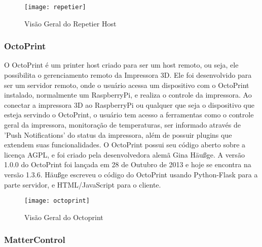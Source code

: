 \begin{figure}[H]
    \centering
    \caption[Repetier Host]{Visão Geral do Repetier Host}
    \texttt{[image: repetier]} 
\end{figure}

\subsubsection{OctoPrint}
O OctoPrint é um printer host criado para ser um host remoto, ou seja, ele possibilita o gerenciamento remoto da Impressora 3D. Ele foi desenvolvido para ser um servidor remoto, onde o usuário acessa um dispositivo com o OctoPrint instalado, normalmente um RaspberryPi, e realiza o controle da impressora. 
Ao conectar a impressora 3D ao RaspberryPi ou qualquer que seja o dispositivo que esteja servindo o OctoPrint, o usuário tem acesso a ferramentas como o controle geral da impressora, monitoração de temperaturas, ser informado através de 'Push Notifications' do status da impressora, além de possuir plugins que extendem suas funcionalidades. O OctoPrint possui seu código aberto sobre a licença AGPL, e foi criado pela desenvolvedora alemã Gina Häußge. A versão 1.0.0 do OctoPrint foi lançada em 28 de Outubro de 2013 e hoje se encontra na versão 1.3.6. 
Häußge escreveu o código do OctoPrint usando Python-Flask para a parte servidor, e HTML/JavaScript para o cliente.
\iffalse
Referências:
- Release: https://github.com/foosel/OctoPrint/releases
- Author: https://foosel.net/
- Licença: https://github.com/foosel/OctoPrint/blob/master/LICENSE
- Site: octoprint.org
- Features: https://octoprint.org/#full-remote-control-and-monitoring
https://octoprint.org/#compatible-and-extendable
\fi
\begin{figure}[H]
    \centering
    \caption[Octoprint]{Visão Geral do Octoprint}
    \texttt{[image: octoprint]} 
\end{figure}

\subsubsection{MatterControl}

